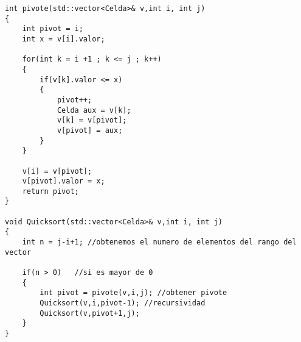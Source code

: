 \begin{lstlisting}[frame=single,basicstyle=\tiny,title={Algoritmo Rapido}]
int pivote(std::vector<Celda>& v,int i, int j)
{
	int pivot = i;
	int x = v[i].valor;
	
	for(int k = i +1 ; k <= j ; k++)
	{
		if(v[k].valor <= x)
		{
			pivot++;
			Celda aux = v[k];
			v[k] = v[pivot];
			v[pivot] = aux;
		}
	}
	
	v[i] = v[pivot];
	v[pivot].valor = x;
	return pivot;
}

void Quicksort(std::vector<Celda>& v,int i, int j)
{
	int n = j-i+1; //obtenemos el numero de elementos del rango del vector
	
	if(n > 0)	//si es mayor de 0
	{
		int pivot = pivote(v,i,j); //obtener pivote
		Quicksort(v,i,pivot-1); //recursividad
		Quicksort(v,pivot+1,j);
	}
}
\end{lstlisting}

